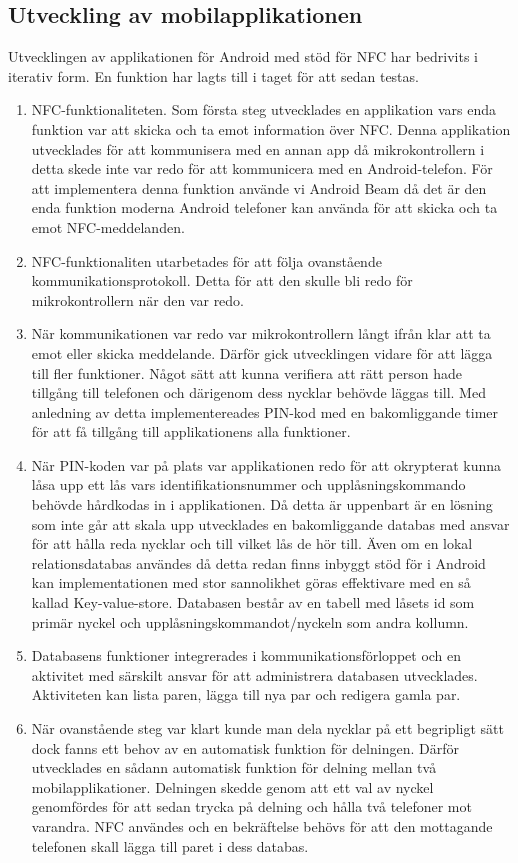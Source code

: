 \documentclass[11pt]{article}
\begin{document}
\subsection{Utveckling av mobilapplikationen}
Utvecklingen av applikationen för Android med stöd för NFC har bedrivits i iterativ form. En funktion har lagts till i taget för att sedan testas.
\begin{enumerate}
\item NFC-funktionaliteten. Som första steg utvecklades en applikation vars enda funktion var att skicka och ta emot information över NFC. Denna applikation utvecklades för att kommunisera med en annan app då mikrokontrollern i detta skede inte var redo för att kommunicera med en Android-telefon. För att implementera denna funktion använde vi Android Beam då det är den enda funktion moderna Android telefoner kan använda för att skicka och ta emot NFC-meddelanden.
\item NFC-funktionaliten utarbetades för att följa ovanstående kommunikationsprotokoll. Detta för att den skulle bli redo för mikrokontrollern när den var redo.
\item När kommunikationen var redo var mikrokontrollern långt ifrån klar att ta emot eller skicka meddelande. Därför gick utvecklingen vidare för att lägga till fler funktioner. Något sätt att kunna verifiera att rätt person hade tillgång till telefonen och därigenom dess nycklar behövde läggas till. Med anledning av detta implementereades PIN-kod med en bakomliggande timer för att få tillgång till applikationens alla funktioner.
\item När PIN-koden var på plats var applikationen redo för att okrypterat kunna låsa upp ett lås vars identifikationsnummer och upplåsningskommando behövde hårdkodas in i applikationen. Då detta är uppenbart är en lösning som inte går att skala upp utvecklades en bakomliggande databas med ansvar för att hålla reda nycklar och till vilket lås de hör till. Även om en lokal relationsdatabas användes då detta redan finns inbyggt stöd för i Android kan implementationen med stor sannolikhet göras effektivare med en så kallad Key-value-store. Databasen består av en tabell med låsets id som primär nyckel och upplåsningskommandot/nyckeln som andra kollumn.
\item Databasens funktioner integrerades i kommunikationsförloppet och en aktivitet med särskilt ansvar för att administrera databasen utvecklades. Aktiviteten kan lista paren, lägga till nya par och redigera gamla par.
\item När ovanstående steg var klart kunde man dela nycklar på ett begripligt sätt dock fanns ett behov av en automatisk funktion för delningen. Därför utvecklades en sådann automatisk funktion för delning mellan två mobilapplikationer. Delningen skedde genom att ett val av nyckel genomfördes för att sedan trycka på delning och hålla två telefoner mot varandra. NFC användes och en bekräftelse behövs för att den mottagande telefonen skall lägga till paret i dess databas.

\end{enumerate}
\end{document}
